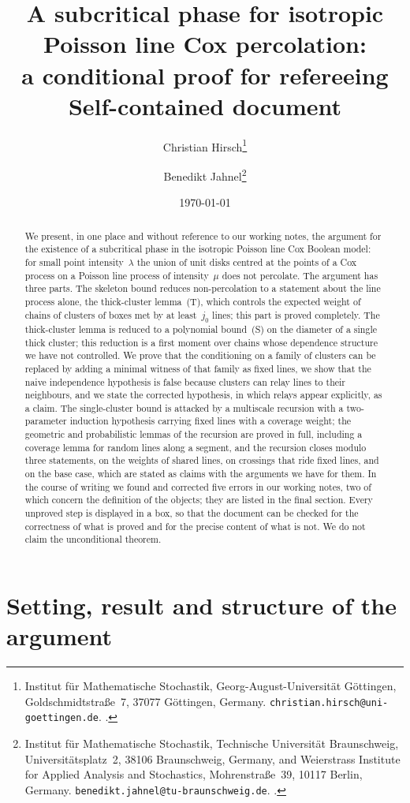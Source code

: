 \documentclass[11pt,letterpaper]{article}
\title{\textbf{A subcritical phase for isotropic Poisson line Cox percolation:\\ a conditional proof for refereeing}\\[0.6em] \large Self-contained document}
\author{%
  Christian Hirsch\thanks{Institut f\"ur Mathematische Stochastik, Georg-August-Universit\"at G\"ottingen, Goldschmidtstra\ss e~7, 37077 G\"ottingen, Germany. \texttt{christian.hirsch@uni-goettingen.de}. \orcid{0000-0003-4136-3740}.}
  \and
  Benedikt Jahnel\thanks{Institut f\"ur Mathematische Stochastik, Technische Universit\"at Braunschweig, Universit\"atsplatz~2, 38106 Braunschweig, Germany, and Weierstrass Institute for Applied Analysis and Stochastics, Mohrenstra\ss e~39, 10117 Berlin, Germany. \texttt{benedikt.jahnel@tu-braunschweig.de}. \orcid{0000-0002-4212-0065}.}%
}
\date{\today}
\begin{document}
\maketitle
\thispagestyle{plain}

\begin{abstract}
We present, in one place and without reference to our working notes, the argument for the existence of a subcritical phase in the isotropic Poisson line Cox Boolean model: for small point intensity~$\lambda$ the union of unit disks centred at the points of a Cox process on a Poisson line process of intensity~$\mu$ does not percolate. The argument has three parts. The skeleton bound reduces non-percolation to a statement about the line process alone, the thick-cluster lemma~(T), which controls the expected weight of chains of clusters of boxes met by at least~$j_0$ lines; this part is proved completely. The thick-cluster lemma is reduced to a polynomial bound~(S) on the diameter of a single thick cluster; this reduction is a first moment over chains whose dependence structure we have not controlled. We prove that the conditioning on a family of clusters can be replaced by adding a minimal witness of that family as fixed lines, we show that the naive independence hypothesis is false because clusters can relay lines to their neighbours, and we state the corrected hypothesis, in which relays appear explicitly, as a claim. The single-cluster bound is attacked by a multiscale recursion with a two-parameter induction hypothesis carrying fixed lines with a coverage weight; the geometric and probabilistic lemmas of the recursion are proved in full, including a coverage lemma for random lines along a segment, and the recursion closes modulo three statements, on the weights of shared lines, on crossings that ride fixed lines, and on the base case, which are stated as claims with the arguments we have for them. In the course of writing we found and corrected five errors in our working notes, two of which concern the definition of the objects; they are listed in the final section. Every unproved step is displayed in a box, so that the document can be checked for the correctness of what is proved and for the precise content of what is not. We do not claim the unconditional theorem.
\end{abstract}

\tableofcontents

\section{Setting, result and structure of the argument}
\label{sec:setting}
\end{document}
